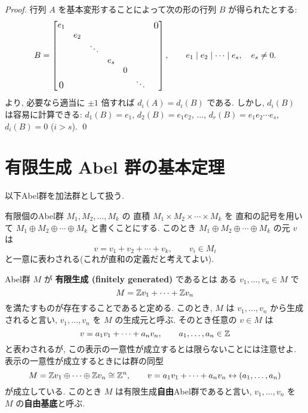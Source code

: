 \documentclass[12pt,twoside]{jarticle}
\begin{document}
\begin{proof}
行列 $A$ を基本変形することによって次の形の行列 $B$ が得られたとする:
\begin{equation*}
  B =
  \begin{bmatrix}
    e_1 &     &        &     &   & & \bigzerou \\
        & e_2 &        &     &   & & \\
        &     & \ddots &     &   & & \\
        &     &        & e_s &   & & \\
        &     &        &     & 0 & & \\
    \bigzerol & &      &     &   & \ddots & \\
  \end{bmatrix},
  \qquad
  e_1\mid e_2\mid\cdots\mid e_s, \quad
  e_s\ne 0.
\end{equation*}
 より, 
必要なら適当に $\pm1$ 倍すれば $d_i(A)=d_i(B)$ である. 
しかし, $d_i(B)$ は容易に計算できる: %
$d_1(B) = e_1$, $d_2(B) = e_1e_2$, $\ldots$, $d_r(B) = e_1e_2\cdots e_s$,
$d_i(B) = 0$ ($i>s$).
\qed
\end{proof}



\section{有限生成 Abel 群の基本定理}
\label{sec:finitely-generated-Abelian-group}

以下Abel群を加法群として扱う.

有限個のAbel群 $M_1,M_2,\ldots,M_k$ の
直積 $M_1\times M_2\times\cdots\times M_k$ を
直和の記号を用いて $M_1\oplus M_2\oplus\cdots\oplus M_k$
と書くことにする. 
このとき $M_1\oplus M_2\oplus\cdots\oplus M_k$ の元 $v$ は
\begin{equation*}
 v = v_1+v_2+\cdots+v_k, 
 \qquad v_i\in M_i
\end{equation*}
と一意に表わされる(これが直和の定義だと考えてよい).

Abel群 $M$ が {\bf 有限生成 (finitely generated)} であるとは
ある $v_1,\dots,v_n\in M$ で
\begin{equation*}
  M = {\mathbb Z} v_1 + \cdots + {\mathbb Z} v_n
\end{equation*}
を満たすものが存在することであると定める.
このとき, $M$ は $v_1,\ldots,v_n$ から生成されると言い, 
$v_1,\ldots,v_n$ を $M$ の生成元と呼ぶ.
そのとき任意の $v\in M$ は
\begin{equation*}
  v = a_1 v_1 + \cdots + a_n v_n,
  \qquad
  a_1,\dots,a_n\in{\mathbb Z}
\end{equation*}
と表わされるが, この表示の一意性が成立するとは限らないことには注意せよ.  
表示の一意性が成立するときには群の同型
\begin{equation*}
 M = {\mathbb Z} v_1\oplus\cdots\oplus{\mathbb Z} v_n \cong {\mathbb Z}^n,
 \qquad
 v=a_1 v_1 + \cdots + a_n v_n \leftrightarrow (a_1,\ldots,a_n)
\end{equation*}
が成立している. このとき $M$ は有限生成{\bf 自由}Abel群であると言い, %
$v_1,\ldots,v_n$ を $M$ の{\bf 自由基底}と呼ぶ.
\end{document}
